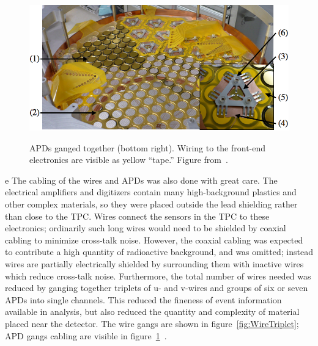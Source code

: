 \begin{figure}
\begin{center}
\includegraphics[keepaspectratio=true,width=\textwidth]{PlatterWGO7.png}
\end{center}
\renewcommand{\baselinestretch}{1}
\small\normalsize
\begin{quote}
\caption{APDs ganged together (bottom right).  Wiring to the front-end electronics are visible as yellow ``tape.''  Figure from~\cite{detectorPartI}.}
\label{fig:APDgang}
\end{quote}
\end{figure}
\renewcommand{\baselinestretch}{2}
\small\normalsize
e 
The cabling of the wires and APDs was also done with great care.  The electrical amplifiers and digitizers contain many high-background plastics and other complex materials, so they were placed outside the lead shielding rather than close to the TPC.  Wires connect the sensors in the TPC to these electronics; ordinarily such long wires would need to be shielded by coaxial cabling to minimize cross-talk noise.  However, the coaxial cabling was expected to contribute a high quantity of radioactive background, and was omitted; instead wires are partially electrically shielded by surrounding them with inactive wires which reduce cross-talk noise.  Furthermore, the total number of wires needed was reduced by ganging together triplets of u- and v-wires and groups of six or seven APDs into single channels. This reduced the fineness of event information available in analysis, but also reduced the quantity and complexity of material placed near the detector.  The wire gangs are shown in figure~\ref{fig:WireTriplet}; APD gangs cabling are visible in figure~\ref{fig:APDgang}~\cite{detectorPartI}.

